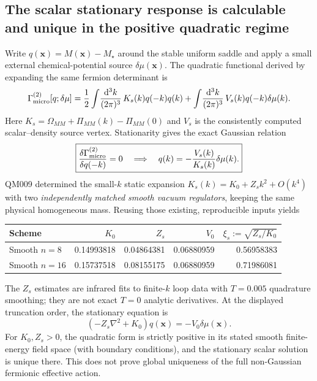 \documentclass[11pt,a4paper]{article}
\begin{document}
\subsection{The scalar stationary response is calculable and unique in the positive quadratic regime}
Write $q(\bm x)=M(\bm x)-M_\star$ around the stable uniform saddle and apply a small external chemical-potential source $\delta\mu(\bm x)$. The quadratic functional derived by expanding the same fermion determinant is
\begin{equation}\label{eq:qm011-gamma2}
\Gamma_{\rm micro}^{(2)}[q;\delta\mu]=\frac12\int\!\frac{\mathrm d^3k}{(2\pi)^3}\,K_s(k)q(-k)q(k)+\int\!\frac{\mathrm d^3k}{(2\pi)^3}\,V_s(k)q(-k)\delta\mu(k).
\end{equation}
Here $K_s=\Omega_{MM}+\Pi_{MM}(k)-\Pi_{MM}(0)$ and $V_s$ is the consistently computed scalar--density source vertex. Stationarity gives the exact Gaussian relation
\begin{equation}\label{eq:qm011-resp}
\boxed{\frac{\delta\Gamma_{\rm micro}^{(2)}}{\delta q(-k)}=0\quad\Longrightarrow\quad q(k)=-\frac{V_s(k)}{K_s(k)}\delta\mu(k).}
\end{equation}
QM009 determined the small-$k$ static expansion $K_s(k)=K_0+Z_s k^2+O(k^4)$ with two \emph{independently matched smooth vacuum regulators}, keeping the same physical homogeneous mass. Reusing those existing, reproducible inputs yields
\begin{center}\small
\begin{tabular}{@{}lrrrr@{}}\toprule
Scheme & $K_0$ & $Z_s$ & $V_0$ & $\xi_s:=\sqrt{Z_s/K_0}$\\\midrule
Smooth $n=8$&0.14993818&0.04864381&0.06880959&0.56958383\\
Smooth $n=16$&0.15737518&0.08155175&0.06880959&0.71986081\\\bottomrule
\end{tabular}
\end{center}
The $Z_s$ estimates are infrared fits to finite-$k$ loop data with $T=0.005$ quadrature smoothing; they are not exact $T=0$ analytic derivatives. At the displayed truncation order, the stationary equation is
\begin{equation}\label{eq:qm011-elliptic}
\boxed{(-Z_s\nabla^2+K_0)q(\bm x)=-V_0\delta\mu(\bm x).}
\end{equation}
For $K_0,Z_s>0$, the quadratic form is strictly positive in its stated smooth finite-energy field space (with boundary conditions), and the stationary scalar solution is unique there. This does not prove global uniqueness of the full non-Gaussian fermionic effective action.
\end{document}
